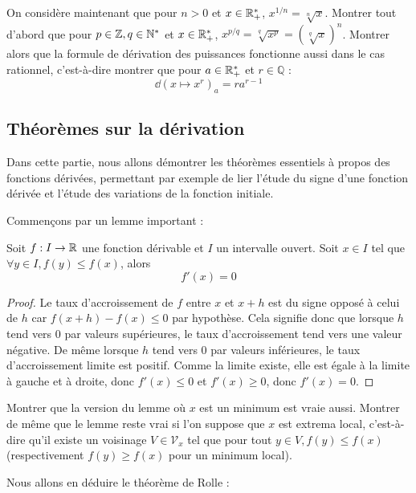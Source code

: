 \begin{exo}
    On considère maintenant que pour $n > 0$ et $x\in\mathbb{R}_+^*$, $x^{1/n} = \sqrt[n]x$. Montrer tout d'abord que pour $p \in \mathbb Z,q\in\mathbb{N}^*$ et $x\in\mathbb{R}_+^*$, $x^{p/q} = \sqrt[q]{x^p} = (\sqrt[q]x)^n$. Montrer alors que la formule de dérivation des puissances fonctionne aussi dans le cas rationnel, c'est-à-dire montrer que pour $a\in \mathbb{R}_+^*$ et $r\in\mathbb Q$ : $$\dd (x\mapsto x^r)_a = ra^{r-1}$$
\end{exo}

\subsection{Théorèmes sur la dérivation}

Dans cette partie, nous allons démontrer les théorèmes essentiels à propos des fonctions dérivées, permettant par exemple de lier l'étude du signe d'une fonction dérivée et l'étude des variations de la fonction initiale.

Commençons par un lemme important :

\begin{lem}
    Soit $f : I \to\mathbb{R}$ une fonction dérivable et $I$ un intervalle ouvert. Soit $x\in I$ tel que $\forall y\in I, f(y) \leq f(x)$, alors $$f'(x) = 0$$
\end{lem}

\begin{proof}
    Le taux d'accroissement de $f$ entre $x$ et $x+h$ est du signe opposé à celui de $h$ car $f(x+h)-f(x) \leq 0$ par hypothèse. Cela signifie donc que lorsque $h$ tend vers $0$ par valeurs supérieures, le taux d'accroissement tend vers une valeur négative. De même lorsque $h$ tend vers $0$ par valeurs inférieures, le taux d'accroissement limite est positif. Comme la limite existe, elle est égale à la limite à gauche et à droite, donc $f'(x) \leq 0$ et $f'(x)\geq 0$, donc $f'(x) = 0$.
\end{proof}

\begin{exo}
    Montrer que la version du lemme où $x$ est un minimum est vraie aussi. Montrer de même que le lemme reste vrai si l'on suppose que $x$ est extrema local, c'est-à-dire qu'il existe un voisinage $V\in\mathcal V_x$ tel que pour tout $y\in V, f(y)\leq f(x)$ (respectivement $f(y)\geq f(x)$ pour un minimum local).
\end{exo}

Nous allons en déduire le théorème de Rolle :

